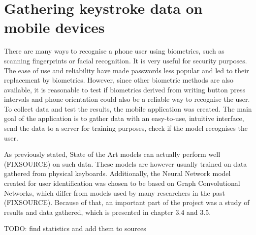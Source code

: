 
\chapter{Gathering keystroke data on mobile devices}

There are many ways to recognise a phone user using biometrics, such as scanning fingerprints or facial recognition. It is very useful for security purposes. The ease of use and reliability have made passwords less popular and led to their replacement by biometrics. However, since other biometric methods are also available, it is reasonable to test if biometrics derived from writing button press intervals and phone orientation could also be a reliable way to recognise the user. To collect data and test the results, the mobile application was created.
The main goal of the application is to gather data with an easy-to-use, intuitive interface, send the data to a server for training purposes, check if the model recognises the user. 

As previously stated, State of the Art models can actually perform well (FIXSOURCE) on such data. These models are however usually trained on data gathered from physical keyboards. Additionally, the Neural Network model created for user identification was chosen to be based on Graph Convolutional Networks, which differ from models used by many researchers in the past (FIXSOURCE).
Because of that, an important part of the project was a study of results and data gathered, which is presented in chapter 3.4 and 3.5.

TODO: find statistics and add them to sources

